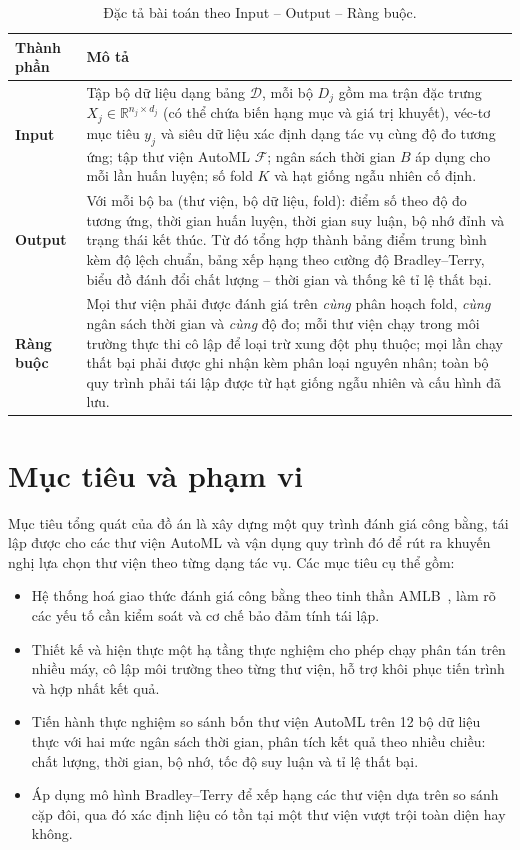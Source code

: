 \begin{table}[H]
  \centering
  \small
  \caption{Đặc tả bài toán theo Input -- Output -- Ràng buộc.}
  \label{tab:io}
  \renewcommand{\arraystretch}{1.3}
  \begin{tabularx}{\linewidth}{@{}l X@{}}
    \toprule
    \textbf{Thành phần} & \textbf{Mô tả} \\
    \midrule
    \textbf{Input} &
    Tập bộ dữ liệu dạng bảng $\mathcal{D}$, mỗi bộ $D_j$ gồm ma trận đặc trưng
    $X_j \in \mathbb{R}^{n_j \times d_j}$ (có thể chứa biến hạng mục và giá trị
    khuyết), véc-tơ mục tiêu $y_j$ và siêu dữ liệu xác định dạng tác vụ cùng độ đo
    tương ứng; tập thư viện AutoML $\mathcal{F}$; ngân sách thời gian $B$ áp dụng
    cho mỗi lần huấn luyện; số fold $K$ và hạt giống ngẫu nhiên cố định. \\
    \textbf{Output} &
    Với mỗi bộ ba (thư viện, bộ dữ liệu, fold): điểm số theo độ đo tương ứng,
    thời gian huấn luyện, thời gian suy luận, bộ nhớ đỉnh và trạng thái kết thúc.
    Từ đó tổng hợp thành bảng điểm trung bình kèm độ lệch chuẩn, bảng xếp hạng
    theo cường độ Bradley--Terry, biểu đồ đánh đổi chất lượng -- thời gian và
    thống kê tỉ lệ thất bại. \\
    \textbf{Ràng buộc} &
    Mọi thư viện phải được đánh giá trên \emph{cùng} phân hoạch fold, \emph{cùng}
    ngân sách thời gian và \emph{cùng} độ đo; mỗi thư viện chạy trong môi trường
    thực thi cô lập để loại trừ xung đột phụ thuộc; mọi lần chạy thất bại phải
    được ghi nhận kèm phân loại nguyên nhân; toàn bộ quy trình phải tái lập được
    từ hạt giống ngẫu nhiên và cấu hình đã lưu. \\
    \bottomrule
  \end{tabularx}
\end{table}

\section{Mục tiêu và phạm vi}
\label{sec:muctieu}
Mục tiêu tổng quát của đồ án là xây dựng một quy trình đánh giá công bằng, tái
lập được cho các thư viện AutoML và vận dụng quy trình đó để rút ra khuyến nghị
lựa chọn thư viện theo từng dạng tác vụ. Các mục tiêu cụ thể gồm:
\begin{itemize}
    \item Hệ thống hoá giao thức đánh giá công bằng theo tinh thần
    AMLB~\cite{gijsbers2024amlb}, làm rõ các yếu tố cần kiểm soát và cơ chế bảo
    đảm tính tái lập.
    \item Thiết kế và hiện thực một hạ tầng thực nghiệm cho phép chạy phân tán
    trên nhiều máy, cô lập môi trường theo từng thư viện, hỗ trợ khôi phục tiến
    trình và hợp nhất kết quả.
    \item Tiến hành thực nghiệm so sánh bốn thư viện AutoML trên 12 bộ dữ liệu
    thực với hai mức ngân sách thời gian, phân tích kết quả theo nhiều chiều:
    chất lượng, thời gian, bộ nhớ, tốc độ suy luận và tỉ lệ thất bại.
    \item Áp dụng mô hình Bradley--Terry để xếp hạng các thư viện dựa trên so sánh
    cặp đôi, qua đó xác định liệu có tồn tại một thư viện vượt trội toàn diện hay
    không.
\end{itemize}

